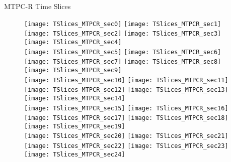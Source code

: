 \documentclass[11pt]{beamer}
\begin{document}
\begin{frame}{MTPC-R Time Slices}
\begin{figure}
\texttt{[image: TSlices\_MTPCR\_sec0]}
\texttt{[image: TSlices\_MTPCR\_sec1]}
\texttt{[image: TSlices\_MTPCR\_sec2]}
\texttt{[image: TSlices\_MTPCR\_sec3]}
\texttt{[image: TSlices\_MTPCR\_sec4]}\\
\texttt{[image: TSlices\_MTPCR\_sec5]}
\texttt{[image: TSlices\_MTPCR\_sec6]}
\texttt{[image: TSlices\_MTPCR\_sec7]}
\texttt{[image: TSlices\_MTPCR\_sec8]}
\texttt{[image: TSlices\_MTPCR\_sec9]}\\
\texttt{[image: TSlices\_MTPCR\_sec10]}
\texttt{[image: TSlices\_MTPCR\_sec11]}
\texttt{[image: TSlices\_MTPCR\_sec12]}
\texttt{[image: TSlices\_MTPCR\_sec13]}
\texttt{[image: TSlices\_MTPCR\_sec14]}\\
\texttt{[image: TSlices\_MTPCR\_sec15]}
\texttt{[image: TSlices\_MTPCR\_sec16]}
\texttt{[image: TSlices\_MTPCR\_sec17]}
\texttt{[image: TSlices\_MTPCR\_sec18]}
\texttt{[image: TSlices\_MTPCR\_sec19]}\\
\texttt{[image: TSlices\_MTPCR\_sec20]}
\texttt{[image: TSlices\_MTPCR\_sec21]}
\texttt{[image: TSlices\_MTPCR\_sec22]}
\texttt{[image: TSlices\_MTPCR\_sec23]}
\texttt{[image: TSlices\_MTPCR\_sec24]}
\end{figure}
\end{frame}
\end{document}
